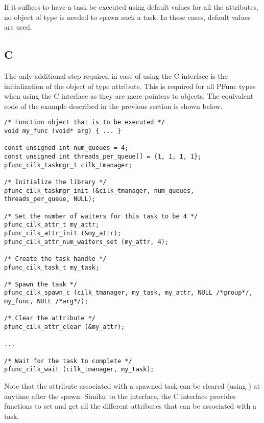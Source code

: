 If it suffices to have a task be executed using default values for all the 
attributes, no object of type  is needed to spawn such a task.
In these cases, default values are used.

\subsection{C}
The only additional step required in case of using the C interface is the 
initialization of the object of type attribute. This is required for all PFunc
types when using the C interface as they are mere pointers to \Cpp{} objects.
The equivalent code of the \Cpp{} example described in the previous section 
is shown below. 

\begin{lstlisting}
/* Function object that is to be executed */
void my_func (void* arg) { ... }

const unsigned int num_queues = 4; 
const unsigned int threads_per_queue[] = {1, 1, 1, 1}; 
pfunc_cilk_taskmgr_t cilk_tmanager;

/* Initialize the library */
pfunc_cilk_taskmgr_init (&cilk_tmanager, num_queues, threads_per_queue, NULL);

/* Set the number of waiters for this task to be 4 */
pfunc_cilk_attr_t my_attr;
pfunc_cilk_attr_init (&my_attr);
pfunc_cilk_attr_num_waiters_set (my_attr, 4);

/* Create the task handle */
pfunc_cilk_task_t my_task;

/* Spawn the task */
pfunc_cilk_spawn_c (cilk_tmanager, my_task, my_attr, NULL /*group*/, my_func, NULL /*arg*/);

/* Clear the attribute */
pfunc_cilk_attr_clear (&my_attr);

...

/* Wait for the task to complete */
pfunc_cilk_wait (cilk_tmanager, my_task);
\end{lstlisting}

Note that the attribute associated with a spawned task can be cleared (using
) at anytime after the spawn. Similar to the \Cpp{}
interface, the C interface provides functions to set and get all the different
attributes that can be associated with a task.
